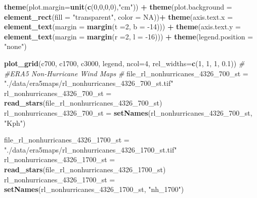 \documentclass[12pt,oneside]{reedthesis}
\newenvironment{Shaded}{\begin{snugshade}}{\end{snugshade}}
\newcommand{\CommentTok}[1]{\textcolor[rgb]{0.56,0.35,0.01}{\textit{#1}}}
\newcommand{\DataTypeTok}[1]{\textcolor[rgb]{0.13,0.29,0.53}{#1}}
\newcommand{\DecValTok}[1]{\textcolor[rgb]{0.00,0.00,0.81}{#1}}
\newcommand{\FloatTok}[1]{\textcolor[rgb]{0.00,0.00,0.81}{#1}}
\newcommand{\KeywordTok}[1]{\textcolor[rgb]{0.13,0.29,0.53}{\textbf{#1}}}
\newcommand{\NormalTok}[1]{#1}
\newcommand{\OperatorTok}[1]{\textcolor[rgb]{0.81,0.36,0.00}{\textbf{#1}}}
\newcommand{\OtherTok}[1]{\textcolor[rgb]{0.56,0.35,0.01}{#1}}
\newcommand{\StringTok}[1]{\textcolor[rgb]{0.31,0.60,0.02}{#1}}
\begin{document}
\begin{Shaded}
\begin{Highlighting}[]
\StringTok{  }\KeywordTok{theme}\NormalTok{(}\DataTypeTok{plot.margin=}\KeywordTok{unit}\NormalTok{(}\KeywordTok{c}\NormalTok{(}\DecValTok{0}\NormalTok{,}\DecValTok{0}\NormalTok{,}\DecValTok{0}\NormalTok{,}\DecValTok{0}\NormalTok{),}\StringTok{"cm"}\NormalTok{)) }\OperatorTok{+}
\StringTok{  }\KeywordTok{theme}\NormalTok{(}\DataTypeTok{plot.background =} \KeywordTok{element_rect}\NormalTok{(}\DataTypeTok{fill =} \StringTok{"transparent"}\NormalTok{, }\DataTypeTok{color =} \OtherTok{NA}\NormalTok{))}\OperatorTok{+}
\StringTok{  }\KeywordTok{theme}\NormalTok{(}\DataTypeTok{axis.text.x =} \KeywordTok{element_text}\NormalTok{(}\DataTypeTok{margin =}  \KeywordTok{margin}\NormalTok{(}\DataTypeTok{t =}\DecValTok{2}\NormalTok{, }\DataTypeTok{b =} \DecValTok{-14}\NormalTok{))) }\OperatorTok{+}\StringTok{ }
\StringTok{  }\KeywordTok{theme}\NormalTok{(}\DataTypeTok{axis.text.y =} \KeywordTok{element_text}\NormalTok{(}\DataTypeTok{margin =}  \KeywordTok{margin}\NormalTok{(}\DataTypeTok{r =}\DecValTok{2}\NormalTok{, }\DataTypeTok{l =} \DecValTok{-16}\NormalTok{))) }\OperatorTok{+}
\StringTok{  }\KeywordTok{theme}\NormalTok{(}\DataTypeTok{legend.position =} \StringTok{"none"}\NormalTok{)}

\KeywordTok{plot_grid}\NormalTok{(c700, c1700, c3000, legend, }\DataTypeTok{ncol=}\DecValTok{4}\NormalTok{, }\DataTypeTok{rel_widths=}\KeywordTok{c}\NormalTok{(}\DecValTok{1}\NormalTok{, }\DecValTok{1}\NormalTok{, }\DecValTok{1}\NormalTok{, }\FloatTok{0.1}\NormalTok{))}
\CommentTok{#}
\CommentTok{#ERA5 Non-Hurricane Wind Maps}
\CommentTok{#}
\NormalTok{file_rl_nonhurricanes_}\DecValTok{4326}\NormalTok{_}\DecValTok{700}\NormalTok{_st =}\StringTok{ "./data/era5maps/rl_nonhurricanes_4326_700_st.tif"}
\NormalTok{rl_nonhurricanes_}\DecValTok{4326}\NormalTok{_}\DecValTok{700}\NormalTok{_st =}\StringTok{ }\KeywordTok{read_stars}\NormalTok{(file_rl_nonhurricanes_}\DecValTok{4326}\NormalTok{_}\DecValTok{700}\NormalTok{_st)}
\NormalTok{rl_nonhurricanes_}\DecValTok{4326}\NormalTok{_}\DecValTok{700}\NormalTok{_st =}\StringTok{ }\KeywordTok{setNames}\NormalTok{(rl_nonhurricanes_}\DecValTok{4326}\NormalTok{_}\DecValTok{700}\NormalTok{_st, }\StringTok{"Kph"}\NormalTok{)}

\NormalTok{file_rl_nonhurricanes_}\DecValTok{4326}\NormalTok{_}\DecValTok{1700}\NormalTok{_st =}\StringTok{ "./data/era5maps/rl_nonhurricanes_4326_1700_st.tif"}
\NormalTok{rl_nonhurricanes_}\DecValTok{4326}\NormalTok{_}\DecValTok{1700}\NormalTok{_st =}\StringTok{ }\KeywordTok{read_stars}\NormalTok{(file_rl_nonhurricanes_}\DecValTok{4326}\NormalTok{_}\DecValTok{1700}\NormalTok{_st)}
\NormalTok{rl_nonhurricanes_}\DecValTok{4326}\NormalTok{_}\DecValTok{1700}\NormalTok{_st =}\StringTok{ }\KeywordTok{setNames}\NormalTok{(rl_nonhurricanes_}\DecValTok{4326}\NormalTok{_}\DecValTok{1700}\NormalTok{_st, }\StringTok{"nh_1700"}\NormalTok{)}


\end{Highlighting}
\end{Shaded}
\end{document}
